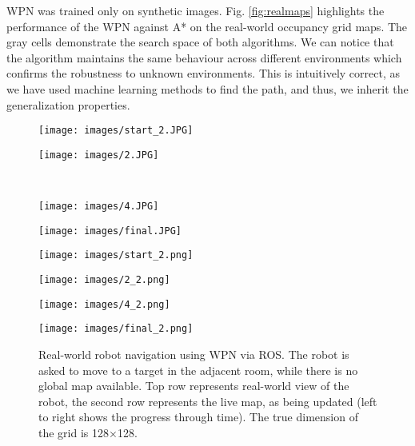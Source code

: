 \documentclass[journal, twocolumn]{IEEEtran}
\begin{document}
 WPN was trained only on synthetic images. Fig.
\ref{fig:realmaps} highlights the performance of the WPN against A* on the real-world occupancy grid maps. The gray cells demonstrate the search space of both algorithms. We can notice that the algorithm maintains the same behaviour across different environments which confirms the robustness to unknown environments. This is intuitively correct, as we have used machine learning methods to find the path, and thus, we inherit the generalization properties. 



\begin{figure}
  \begin{minipage}[b]{0.115\textwidth}
  \centering
    \texttt{[image: images/start\_2.JPG]}
  \end{minipage}
  \hfill
  \begin{minipage}[b]{0.115\textwidth}
  \centering
    \texttt{[image: images/2.JPG]}
  \end{minipage}
  \hfill\
  \begin{minipage}[b]{0.115\textwidth}
  \centering
    \texttt{[image: images/4.JPG]}
  \end{minipage}
  \hfill
  \begin{minipage}[b]{0.115\textwidth}
  \centering
    \texttt{[image: images/final.JPG]}
    \end{minipage}  
  \begin{minipage}[b]{0.115\textwidth}
  \centering
    \texttt{[image: images/start\_2.png]}
  \end{minipage}
  \hfill
  \begin{minipage}[b]{0.115\textwidth}
  \centering
    \texttt{[image: images/2\_2.png]}
  \end{minipage}
  \hfill
  \begin{minipage}[b]{0.115\textwidth}
  \centering
    \texttt{[image: images/4\_2.png]}
  \end{minipage}
  \hfill
  \begin{minipage}[b]{0.115\textwidth}
  \centering
    \texttt{[image: images/final\_2.png]}    
    \end{minipage}  
  \caption{Real-world robot navigation using WPN via ROS. 
  The robot is asked to move to a target in the adjacent room, while there is no global map available. Top row represents real-world view of the robot, the second row represents the live map, as being updated (left to right shows the progress through time). The true dimension of the grid is 128$\times$128.}
  \vspace{-1 mm}
  \label{fig: robot_run}
  \end{figure}
\end{document}
